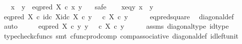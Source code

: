 \begin{isabellebody}
\ \ \ {\isachardoublequoteopen}{\isacharparenleft}{\kern0pt}x\ {\isacharequal}{\kern0pt}\ y{\isacharparenright}{\kern0pt}\ {\isacharequal}{\kern0pt}\ {\isacharparenleft}{\kern0pt}eq{\isacharunderscore}{\kern0pt}pred\ X\ {\isasymcirc}\isactrlsub c\ {\isasymlangle}x{\isacharcomma}{\kern0pt}\ y{\isasymrangle}\ {\isacharequal}{\kern0pt}\ {\isasymt}{\isacharparenright}{\kern0pt}{\isachardoublequoteclose}\isanewline
%
\isadelimproof
%
\endisadelimproof
%
\isatagproof
{}\isamarkupfalse%
\ safe\isanewline
\ \ \isamarkupfalse%
\ x{\isacharunderscore}{\kern0pt}eq{\isacharunderscore}{\kern0pt}y{\isacharcolon}{\kern0pt}\ {\isachardoublequoteopen}x\ {\isacharequal}{\kern0pt}\ y{\isachardoublequoteclose}\isanewline
\isanewline
\ \ \isamarkupfalse%
\ {\isachardoublequoteopen}{\isacharparenleft}{\kern0pt}eq{\isacharunderscore}{\kern0pt}pred\ X\ {\isasymcirc}\isactrlsub c\ {\isasymlangle}id\isactrlsub c\ X{\isacharcomma}{\kern0pt}id\isactrlsub c\ X{\isasymrangle}{\isacharparenright}{\kern0pt}\ {\isasymcirc}\isactrlsub c\ y\ {\isacharequal}{\kern0pt}\ {\isacharparenleft}{\kern0pt}{\isasymt}\ {\isasymcirc}\isactrlsub c\ {\isasymbeta}\isactrlbsub X\isactrlesub {\isacharparenright}{\kern0pt}\ {\isasymcirc}\isactrlsub c\ y{\isachardoublequoteclose}\isanewline
\ \ \ \ \isamarkupfalse%
\ eq{\isacharunderscore}{\kern0pt}pred{\isacharunderscore}{\kern0pt}square\ \isamarkupfalse%
\ diagonal{\isacharunderscore}{\kern0pt}def\ \isamarkupfalse%
\ auto\isanewline
\ \ \isamarkupfalse%
\ \isamarkupfalse%
\ {\isachardoublequoteopen}eq{\isacharunderscore}{\kern0pt}pred\ X\ {\isasymcirc}\isactrlsub c\ {\isasymlangle}y{\isacharcomma}{\kern0pt}\ y{\isasymrangle}\ {\isacharequal}{\kern0pt}\ {\isacharparenleft}{\kern0pt}{\isasymt}\ {\isasymcirc}\isactrlsub c\ {\isasymbeta}\isactrlbsub X\isactrlesub {\isacharparenright}{\kern0pt}\ {\isasymcirc}\isactrlsub c\ y{\isachardoublequoteclose}\isanewline
\ \ \ \ \isamarkupfalse%
\ assms\ diagonal{\isacharunderscore}{\kern0pt}type\ id{\isacharunderscore}{\kern0pt}type\isanewline
\ \ \ \ \isamarkupfalse%
\ {\isacharparenleft}{\kern0pt}typecheck{\isacharunderscore}{\kern0pt}cfuncs{\isacharcomma}{\kern0pt}\ smt\ cfunc{\isacharunderscore}{\kern0pt}prod{\isacharunderscore}{\kern0pt}comp\ comp{\isacharunderscore}{\kern0pt}associative{}\ diagonal{\isacharunderscore}{\kern0pt}def\ id{\isacharunderscore}{\kern0pt}left{\isacharunderscore}{\kern0pt}unit{}{\isacharparenright}{\kern0pt}\isanewline

\end{isabellebody}
